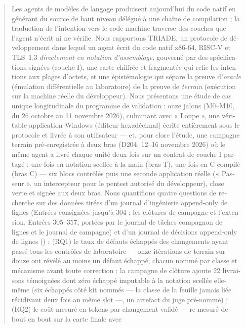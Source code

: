\documentclass[11pt,a4paper]{article}
\begin{document}
\begin{otherlanguage}{french}
\begin{abstract}
\noindent Les agents de modèles de langage produisent aujourd'hui du code
natif en générant du source de haut niveau délégué à une chaîne de
compilation ; la traduction de l'intention vers le code machine traverse
des couches que l'agent n'écrit ni ne vérifie. Nous rapportons TRIADE, un
protocole de développement dans lequel un agent écrit du code natif
x86-64, RISC-V et TLS~1.3 \emph{directement en notation d'assemblage},
gouverné par des spécifications signées (couche I), une carte chiffrée et
fragmentée qui relie les intentions aux plages d'octets, et une
épistémologie qui sépare la preuve d'\emph{oracle} (émulation
différentielle au laboratoire) de la preuve de \emph{terrain} (exécution
sur la machine réelle du développeur). Nous présentons une étude de cas
unique longitudinale du programme de validation : onze jalons (M0--M10, du
26 octobre au 11 novembre 2026), culminant avec « Loupe », une véritable
application Windows (éditeur hexadécimal) écrite entièrement sous le
protocole et livrée à son utilisateur — et, pour clore l'étude, une
campagne terrain pré-enregistrée à deux bras (D204, 12--16 novembre 2026)
où le même agent a livré chaque unité deux fois sur un contrat de
couche I partagé : une fois en notation scellée à la main (bras T), une
fois en C compilé (bras C) — six blocs contrôlés puis une seconde
application réelle (« Passeur », un intercepteur pour le pentest
autorisé du développeur), close verte et signée aux deux bras. Nous quantifions quatre questions
de recherche sur des données tirées d'un journal d'ingénierie append-only
de \nbLignesJournal{} lignes (Entrées consignées jusqu'à 304 ; les clôtures
de campagne et l'extension, Entrées 305--357, portées par le journal de tâches
compagnon de \nbLignesWorklog{} lignes et le journal de campagne) et d'un
journal de décisions append-only de \nbLignesDecisions{} lignes
(\plageDecisions) : (RQ1) le taux de défauts échappés des changements ayant
passé tous les contrôles de laboratoire — onze itérations de terrain sur
douze ont révélé au moins un défaut échappé, chacun nommé par classe et
mécanisme avant toute correction ; la campagne de clôture ajoute 22
livraisons témoignées dont zéro échappé imputable à la notation
scellée elle-même (six échappés côté kit nommés — la classe de la
feuille jamais liée récidivant deux fois au même slot —, un artefact
du juge pré-nommé) ; (RQ2) le coût mesuré en tokens par
changement validé — re-mesuré de bout en bout sur la carte finale avec

\end{abstract}
\end{otherlanguage}
\end{document}
